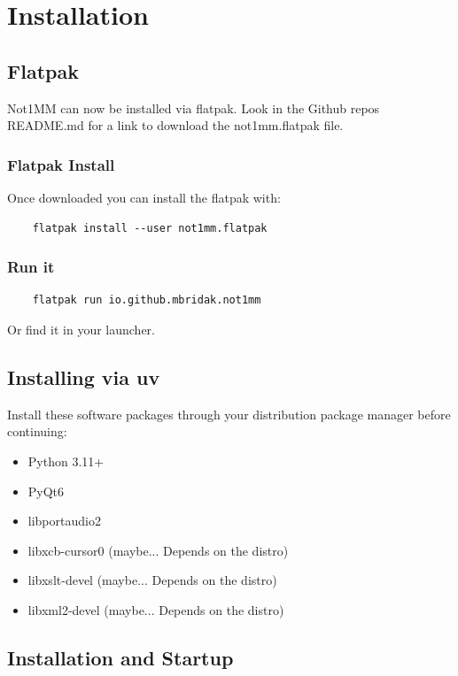 \documentclass{article}
\begin{document}
\section{Installation}

\subsection{Flatpak}
Not1MM can now be installed via flatpak. Look in the Github repos README.md for a link to download the not1mm.flatpak file.
\subsubsection{Flatpak Install}
Once downloaded you can install the flatpak with:

\begin{verbatim}
    flatpak install --user not1mm.flatpak
\end{verbatim}

\subsubsection{Run it}
\begin{verbatim}
    flatpak run io.github.mbridak.not1mm
\end{verbatim}
 
Or find it in your launcher.

\subsection{Installing via uv}
Install these software packages through your distribution package manager before continuing:
\begin{itemize}
    \item Python 3.11+
    \item PyQt6
    \item libportaudio2
    \item libxcb-cursor0 (maybe... Depends on the distro)
    \item libxslt-devel  (maybe... Depends on the distro)
    \item libxml2-devel  (maybe... Depends on the distro)
\end{itemize}

\subsection{Installation and Startup}
\end{document}
